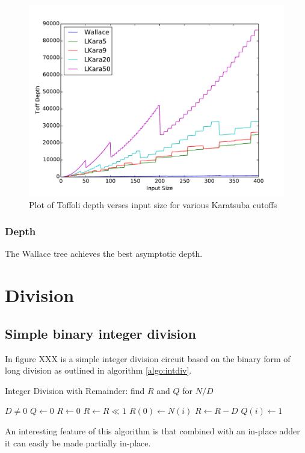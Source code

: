       \begin{figure}
        \capstart
        \includegraphics[width=\textwidth]{images/LKaraDepth2}
        \caption{Plot of Toffoli depth verses input size for various Karatsuba cutoffs}
        \label{fig:depth}
      \end{figure}

    \subsubsection{Depth}
      The Wallace tree achieves the best asymptotic depth.

\section{Division}
  \subsection{Simple binary integer division}
    In figure XXX is a simple integer division circuit based on the binary form of long division as outlined in algorithm \ref{algo:intdiv}.
    \begin{program}
      \capstart
      \caption{Integer Division with Remainder: find $R$ and $Q$ for $N/D$}
      \begin{algorithmic}[1]
        \Require $D \neq 0$
        \State $Q \gets 0$
        \State $R \gets 0$
          \State $R \gets R \ll 1$
          \State $R(0) \gets N(i)$ \label{line:intdiv:setToN}
           \label{line:intdiv:compare}
            \State $R\gets R - D$
            \State $Q(i) \gets 1$ \label{line:intdiv:setQ}

          \EndIf
        \EndFor
      \end{algorithmic}
      \label{algo:intdiv}
    \end{program}
    An interesting feature of this algorithm is that combined with an in-place adder\cite{CDKM:2004} it can easily be made partially in-place.

